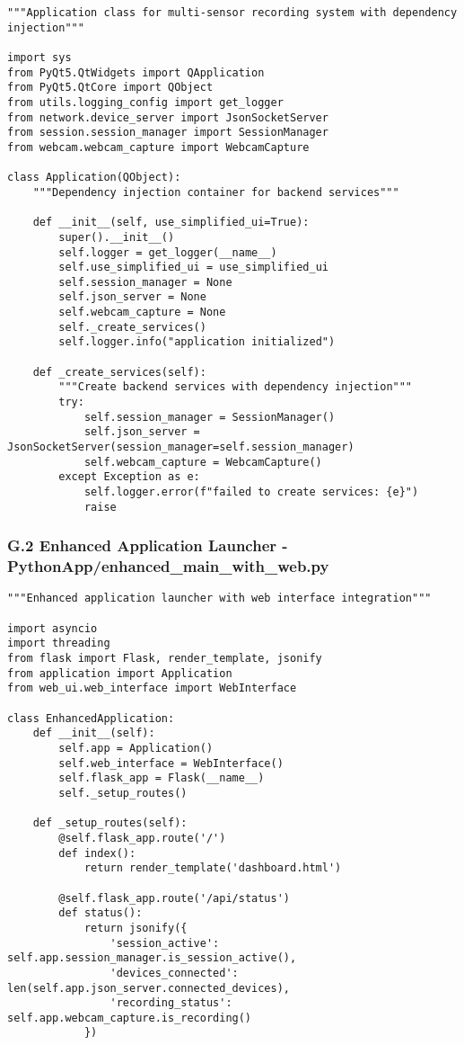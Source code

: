 \documentclass[12pt,a4paper]{article}
\begin{document}
\begin{verbatim}
"""Application class for multi-sensor recording system with dependency injection"""

import sys
from PyQt5.QtWidgets import QApplication
from PyQt5.QtCore import QObject
from utils.logging_config import get_logger
from network.device_server import JsonSocketServer
from session.session_manager import SessionManager
from webcam.webcam_capture import WebcamCapture

class Application(QObject):
    """Dependency injection container for backend services"""
    
    def __init__(self, use_simplified_ui=True):
        super().__init__()
        self.logger = get_logger(__name__)
        self.use_simplified_ui = use_simplified_ui
        self.session_manager = None
        self.json_server = None
        self.webcam_capture = None
        self._create_services()
        self.logger.info("application initialized")
    
    def _create_services(self):
        """Create backend services with dependency injection"""
        try:
            self.session_manager = SessionManager()
            self.json_server = JsonSocketServer(session_manager=self.session_manager)
            self.webcam_capture = WebcamCapture()
        except Exception as e:
            self.logger.error(f"failed to create services: {e}")
            raise
\end{verbatim}

\subsubsection{G.2 Enhanced Application Launcher - PythonApp/enhanced_main_with_web.py}

\begin{verbatim}
"""Enhanced application launcher with web interface integration"""

import asyncio
import threading
from flask import Flask, render_template, jsonify
from application import Application
from web_ui.web_interface import WebInterface

class EnhancedApplication:
    def __init__(self):
        self.app = Application()
        self.web_interface = WebInterface()
        self.flask_app = Flask(__name__)
        self._setup_routes()
    
    def _setup_routes(self):
        @self.flask_app.route('/')
        def index():
            return render_template('dashboard.html')
        
        @self.flask_app.route('/api/status')
        def status():
            return jsonify({
                'session_active': self.app.session_manager.is_session_active(),
                'devices_connected': len(self.app.json_server.connected_devices),
                'recording_status': self.app.webcam_capture.is_recording()
            })
\end{verbatim}
\end{document}
